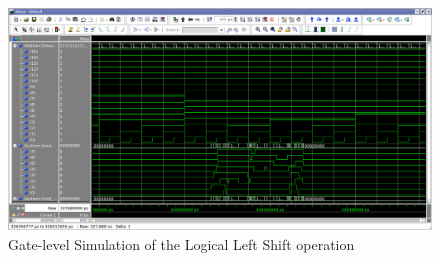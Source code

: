 \documentclass[a4paper, 11pt]{article}
\begin{document}
\begin{figure}[h]
\centering
\includegraphics[scale=0.33]{leftshift_Gate}
\caption{Gate-level Simulation of the Logical Left Shift operation}
\end{figure}
\end{document}
